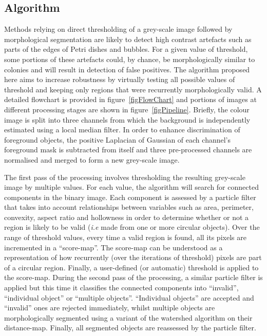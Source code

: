 \documentclass[10pt]{article}
\begin{document}
\subsection*{Algorithm} 
Methods relying on direct thresholding of a grey-scale image followed
by morphological segmentation are likely to detect high contrast artefacts such
as parts of the edges of Petri dishes and bubbles.  For a given value of threshold,
some portions of these artefacts could, by chance, be morphologically similar to colonies and will result in
detection of false positives.
The algorithm proposed here aims to increase robustness by virtually testing
all possible values of threshold and keeping only regions that were recurrently morphologically
valid. A detailed flowchart is provided in figure~\ref{figFlowChart} and portions of images 
at different processing stages are shown in figure~\ref{figPipeline}.
Briefly, the colour image is split into three channels from which the background
is independently estimated using a local median filter.
In order to enhance discrimination of foreground objects,  the positive
Laplacian of Gaussian of each channel's foreground mask is subtracted from
itself and three pre-processed channels are normalised and merged to form a
new grey-scale image.

The first pass of the processing involves thresholding the resulting grey-scale
image by multiple values.
For each value, the algorithm will search for connected components in the binary
image.
Each component is assessed by a particle filter that takes into account relationships
between variables such as area, perimeter, convexity, aspect ratio and
hollowness in order to determine whether or not a region is likely to be valid 
(\emph{i.e} made from one or more circular objects).
Over the range of threshold values, every time a valid region is found, all
its pixels are incremented in a ``score-map''.
The score-map can be understood as a representation of how recurrently (over the
iterations of threshold) pixels are part of a circular region. Finally,  a
user-defined (or automatic) threshold is applied to the score-map.
During the second pass of the processing, a similar particle filter is applied
but this time it classifies the connected components into ``invalid'',
``individual object'' or ``multiple objects''.
``Individual objects'' are accepted and ``invalid'' ones  are rejected
immediately, whilst multiple objects are morphologically segmented using a variant
of the watershed algorithm on their distance-map\cite{marotz_effective_2001}.
Finally, all segmented objects are reassessed by the particle filter.
\end{document}
